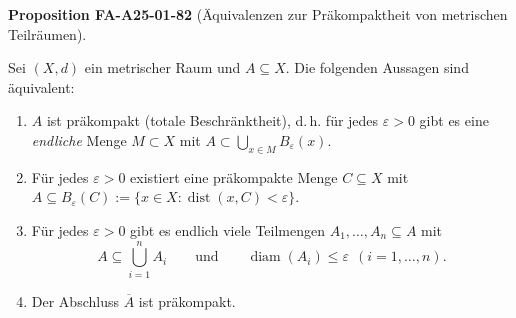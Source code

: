 \documentclass[10pt, letterpaper]{article}
\newcommand{\CustomHeading}[3]{%
  \par\medskip\noindent%
  \textbf{#1 #2} \textnormal{(#3)}.\enskip%
}
\newenvironment{PROP}[2]{\begin{unitbox}\CustomHeading{Proposition}{#1}{#2}}{\end{unitbox}}
\begin{document}
\begin{PROP}{FA-A25-01-82}{Äquivalenzen zur Präkompaktheit von metrischen Teilräumen}
Sei $(X,d)$ ein metrischer Raum und $A\subseteq X$. Die folgenden Aussagen sind äquivalent:
\begin{enumerate}
\item[(i)] $A$ ist präkompakt (totale Beschränktheit), d.\,h. für jedes $\varepsilon>0$ gibt es eine \emph{endliche}
Menge $M\subset X$ mit $A\subset \bigcup_{x\in M} B_\varepsilon(x)$.
\item[(ii)] Für jedes $\varepsilon>0$ existiert eine präkompakte Menge $C\subseteq X$ mit
$A\subseteq B_\varepsilon(C):=\{x\in X:\operatorname{dist}(x,C)<\varepsilon\}$.
\item[(iii)] Für jedes $\varepsilon>0$ gibt es endlich viele Teilmengen $A_1,\dots,A_n\subseteq A$ mit
\[
A\subseteq \bigcup_{i=1}^n A_i
\qquad\text{und}\qquad
\operatorname{diam}(A_i)\le \varepsilon\ \ (i=1,\dots,n).
\]
\item[(iv)] Der Abschluss $\overline{A}$ ist präkompakt.
\end{enumerate}
\end{PROP}
\end{document}
